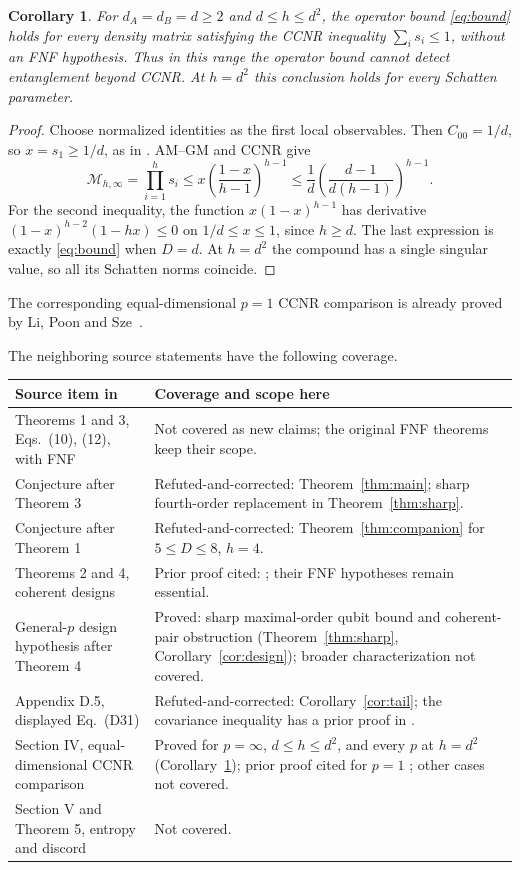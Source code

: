 \documentclass[11pt]{article}
\newtheorem{corollary}[theorem]{Corollary}
\newcommand{\CM}{\mathcal M}
\begin{document}
\begin{corollary}\label{cor:equal}
For $d_A=d_B=d\ge2$ and $d\le h\le d^2$, the operator bound
\eqref{eq:bound} holds for every density matrix satisfying the CCNR
inequality $\sum_i s_i\le1$, without an FNF hypothesis. Thus in this
range the operator bound cannot detect entanglement beyond CCNR.
At $h=d^2$ this conclusion holds for every Schatten parameter.
\end{corollary}
\begin{proof}
Choose normalized identities as the first local observables. Then
$C_{00}=1/d$, so $x=s_1\ge1/d$, as in \cite[Lemma 2.1]{lipoon}.
AM--GM and CCNR give
\[
 \CM_{h,\infty}=\prod_{i=1}^h s_i
 \le x\left(\frac{1-x}{h-1}\right)^{h-1}
 \le\frac1d\left(\frac{d-1}{d(h-1)}\right)^{h-1}.
\]
For the second inequality, the function
$x(1-x)^{h-1}$ has derivative $(1-x)^{h-2}(1-hx)\le0$
on $1/d\le x\le1$, since $h\ge d$. The last expression is exactly
\eqref{eq:bound} when $D=d$. At $h=d^2$ the compound has a single
singular value, so all its Schatten norms coincide.
\end{proof}
The corresponding equal-dimensional $p=1$ CCNR comparison is already
proved by Li, Poon and Sze~\cite[Theorem 2.4]{lipoon}.

The neighboring source statements have the following coverage.
\begin{center}\small
\begin{tabular}{p{.34\linewidth}p{.57\linewidth}}
\toprule
Source item in \cite{peled} & Coverage and scope here\\
\midrule
Theorems 1 and 3, Eqs.~(10), (12), with FNF & Not covered as new claims; the original FNF theorems keep their scope.\\
Conjecture after Theorem 3 & Refuted-and-corrected: Theorem~\ref{thm:main}; sharp fourth-order replacement in Theorem~\ref{thm:sharp}.\\
Conjecture after Theorem 1 & Refuted-and-corrected: Theorem~\ref{thm:companion} for $5\le D\le8$, $h=4$.\\
Theorems 2 and 4, coherent designs & Prior proof cited: \cite[Appendices D.3, D.6]{peled}; their FNF hypotheses remain essential.\\
General-$p$ design hypothesis after Theorem 4 & Proved: sharp maximal-order qubit bound and coherent-pair obstruction (Theorem~\ref{thm:sharp}, Corollary~\ref{cor:design}); broader characterization not covered.\\
Appendix D.5, displayed Eq.~(D31) & Refuted-and-corrected: Corollary~\ref{cor:tail}; the covariance inequality has a prior proof in \cite{covariance}.\\
Section IV, equal-dimensional CCNR comparison & Proved for $p=\infty$, $d\le h\le d^2$, and every $p$ at $h=d^2$ (Corollary~\ref{cor:equal}); prior proof cited for $p=1$ \cite[Theorem 2.4]{lipoon}; other cases not covered.\\
Section V and Theorem 5, entropy and discord & Not covered.\\
\bottomrule
\end{tabular}
\end{center}
\end{document}
